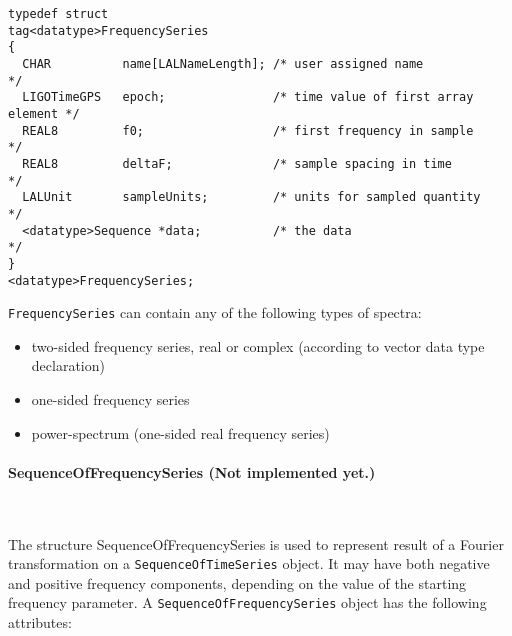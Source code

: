 \documentclass[]{ligodcc}
\renewcommand{\texttt}[1]{{\ttfamily\color{blue}#1}}
\begin{document}
{\footnotesize
\begin{verbatim}
typedef struct
tag<datatype>FrequencySeries
{
  CHAR          name[LALNameLength]; /* user assigned name                */
  LIGOTimeGPS   epoch;               /* time value of first array element */
  REAL8         f0;                  /* first frequency in sample         */
  REAL8         deltaF;              /* sample spacing in time            */
  LALUnit       sampleUnits;         /* units for sampled quantity        */
  <datatype>Sequence *data;          /* the data                          */
}
<datatype>FrequencySeries;
\end{verbatim}}

\noindent
{\tt FrequencySeries} can contain any of the following types of spectra:
\begin{itemize}
\item
two-sided frequency series, real or complex (according to vector data
type declaration)
\vspace{-0.15in}
\item
one-sided frequency series
\vspace{-0.15in}
\item
power-spectrum (one-sided real frequency series)
\end{itemize}

\paragraph{{\texttt {SequenceOfFrequencySeries}} {\bf (Not implemented
yet.)} }~


The structure SequenceOfFrequencySeries is used to represent result of
a Fourier transformation on a {\tt SequenceOfTimeSeries} object. It
may have both negative and positive frequency components, depending
on the value of the starting frequency parameter. A 
{\tt SequenceOfFrequencySeries} object has the following attributes:
\end{document}
